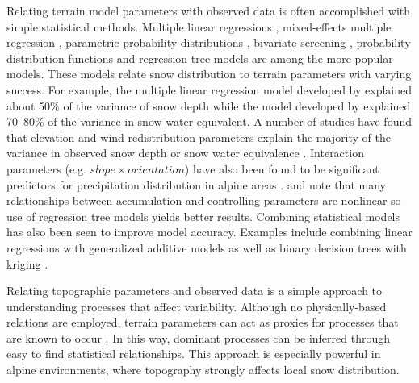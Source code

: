 \documentclass{sfuthesis}
\begin{document}
Relating terrain model parameters with observed data is often accomplished with simple statistical methods. Multiple linear regressions \citep{Marchand2005, Sold2013, McGrath2015}, mixed-effects multiple regression \citep{Kasurak2011}, parametric probability distributions \citep{Clark2011}, bivariate screening \citep{Anderton2004}, probability distribution functions \citep{Kerr2013} and regression tree models \citep{Elder1998, Winstral2002, Molotch2005, Revuelto2014, Wetlaufer2016} are among the more popular models. These models relate snow distribution to terrain parameters with varying success. For example, the multiple linear regression model developed by \cite{Sold2013} explained about 50$\%$ of the variance of snow depth while the model developed by \cite{Anderton2004} explained 70--80$\%$ of the variance in snow water equivalent. A number of studies have found that elevation and wind redistribution parameters explain the majority of the variance in observed snow depth or snow water equivalence \citep[e.g.][]{Erickson2005, Trujillo2009,Schirmer2011, Grunewald2014, McGrath2015}. Interaction parameters (e.g. $slope \times orientation$) have also been found to be significant predictors for precipitation distribution in alpine areas \citep{Basist1994}. \cite{Erxleben2002} and \cite{Molotch2005} note that many relationships between accumulation and controlling parameters are nonlinear so use of regression tree models yields better results. Combining statistical models has also been seen to improve model accuracy. Examples include combining linear regressions with generalized additive models \citep{Lopez2006} as well as binary decision trees with kriging \citep{Balk2000}. 

Relating topographic parameters and observed data is a simple approach to understanding processes that affect variability. Although no physically-based relations are employed, terrain parameters can act as proxies for processes that are known to occur \citep{McGrath2015}. In this way, dominant processes can be inferred through easy to find statistical relationships. This approach is especially powerful in alpine environments, where topography strongly affects local snow distribution. 
\end{document}
